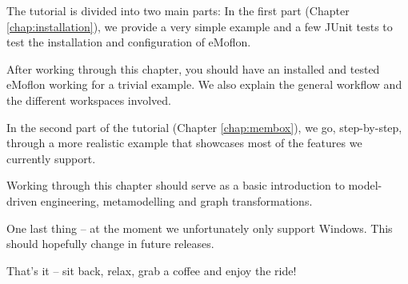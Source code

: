 The tutorial is divided into two main parts:  In the first part (Chapter
\ref{chap:installation}), we provide a very simple example and a few JUnit tests
to test the installation and configuration of eMoflon.

After working through this chapter, you should have an installed
and tested eMoflon working for a trivial example.
We also explain the general workflow and the different workspaces involved.

In the second part of the tutorial (Chapter \ref{chap:membox}), we go,
step-by-step, through a more realistic example that showcases most of the
features we currently support.

Working through this chapter should serve as a basic introduction to
model-driven engineering, metamodelling and graph
transformations.

One last thing -- at the moment we unfortunately only support Windows.
This should hopefully change in future releases.

That's it -- sit back, relax, grab a coffee and enjoy the ride!


